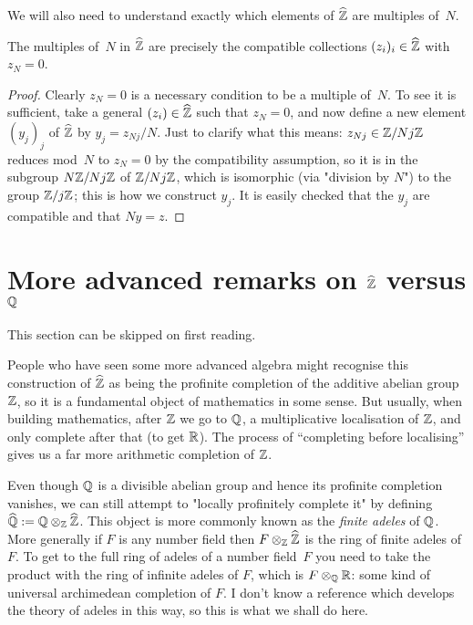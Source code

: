 We will also need to understand exactly which elements of $\widehat{\mathbb{Z}}$
are multiples of~$N$.

\begin{lemma}
    \label{ZHat.multiples}
    \leanok
    The multiples of~$N$ in $\widehat{\mathbb{Z}}$ are precisely the compatible collections $(z_i)_i\in\widehat{\mathbb{Z}}$ 
    with $z_N=0$.
\end{lemma}
\begin{proof}
    Clearly $z_N=0$ is a necessary condition to be a multiple of~$N$. To see it is sufficient, 
    take a general $(z_i)\in\widehat{\mathbb{Z}}$ such that $z_N=0$, 
    and now define a new element $(y_j)_j$ of $\widehat{\mathbb{Z}}$
    by $y_j=z_{Nj}/N$. Just to clarify what this means: $z_{Nj}\in\mathbb{Z}/Nj\mathbb{Z}$ reduces mod~$N$ 
    to $z_N=0$ by the compatibility assumption, so it is in the subgroup $N\mathbb{Z}/Nj\mathbb{Z}$ of $\mathbb{Z}/Nj\mathbb{Z}$, 
    which is isomorphic (via "division by $N$") to the group $\mathbb{Z}/j\mathbb{Z}$; this is how we construct 
    $y_j$. It is easily checked that the $y_j$ are compatible and that $Ny=z$.
\end{proof}

\section{More advanced remarks on $\widehat{\mathbb{Z}}$ versus $\mathbb{Q}$}

This section can be skipped on first reading.

People who have seen some more advanced algebra might recognise this construction of $\widehat{\mathbb{Z}}$
as being the profinite completion of the additive abelian group $\mathbb{Z}$, so it is a fundamental
object of mathematics in some sense. But usually, when building mathematics, after $\mathbb{Z}$ we 
go to $\mathbb{Q}$, a multiplicative localisation of $\mathbb{Z}$, and only complete after that (to get $\mathbb{R}$).
The process of ``completing before localising'' gives us a far more arithmetic completion
of $\mathbb{Z}$.

Even though $\mathbb{Q}$ is a divisible abelian group and hence its profinite completion vanishes,
we can still attempt to "locally profinitely complete it" by defining $\widehat{\mathbb{Q}}:=\mathbb{Q}\otimes_{\mathbb{Z}}\widehat{\mathbb{Z}}$. 
This object is more commonly known as the \emph{finite adeles} of $\mathbb{Q}$. More generally if $F$ is
any number field then $F\otimes_{\mathbb{Z}}\widehat{\mathbb{Z}}$ is the ring of finite adeles of $F$. To get to
the full ring of adeles of a number field~$F$ you need to take the product with the
ring of infinite adeles of $F$, which is $F\otimes_{\mathbb{Q}}\mathbb{R}$: some kind of universal
archimedean completion of $F$. I don't know a reference which develops the theory of adeles
in this way, so this is what we shall do here.

